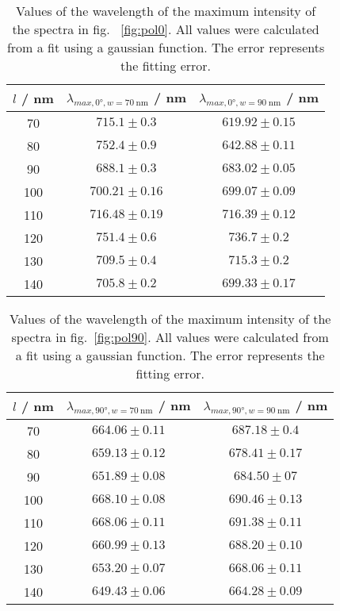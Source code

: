 \begin{table}
    \centering
    \begin{tabular}{c|cc}
        \toprule
        $l$ / \si{\nano\meter} &   $\lambda_{max,\ang{0},w=\SI{70}{\nano\meter}}$ / \si{\nano\meter}& $\lambda_{max,\ang{0},w=\SI{90}{\nano\meter}}$ / \si{\nano\meter}\\
        \midrule
        70 &  $715.1 \pm 0.3$&  $619.92\pm 0.15$\\
        80 &  $752.4 \pm 0.9$&  $642.88\pm 0.11$\\
        90  &  $688.1\pm 0.3$&  $683.02\pm 0.05$\\
        100 &  $700.21\pm 0.16$&  $699.07\pm 0.09$\\
        110 &  $716.48\pm 0.19$&  $716.39\pm 0.12$\\
        120 &  $751.4\pm 0.6$&  $736.7\pm 0.2$\\
        130 &  $709.5\pm 0.4$&  $715.3\pm 0.2$\\
        140 &  $705.8\pm 0.2$&  $699.33\pm 0.17$\\
        \bottomrule
    \end{tabular}
    \caption{Values of the wavelength of the maximum intensity of the spectra in fig.~ \ref{fig:pol0}. All values were calculated from a fit using a gaussian function. The error represents the fitting error.}
    \label{tab:lamMax0}
\end{table}

\begin{table}
    \centering
    \begin{tabular}{c|cc}
        \toprule
        $l$ / \si{\nano\meter} & $\lambda_{max,\ang{90},w=\SI{70}{\nano\meter}}$ / \si{\nano\meter}& $\lambda_{max,\ang{90},w=\SI{90}{\nano\meter}}$ / \si{\nano\meter}\\
        \midrule
        70  &  $664.06\pm 0.11$&  $687.18\pm 0.4$\\
        80  &  $659.13\pm 0.12$&  $678.41\pm 0.17$\\
        90  &  $651.89\pm 0.08$&  $684.50\pm 07$\\
        100 &  $668.10\pm 0.08$&  $690.46\pm 0.13$\\
        110 &  $668.06\pm 0.11$&  $691.38\pm 0.11$\\
        120 &  $660.99\pm 0.13$&  $688.20\pm 0.10$\\
        130 &  $653.20\pm 0.07$&   $668.06\pm 0.11$\\
        140 &  $649.43\pm 0.06$&  $664.28\pm 0.09$\\
        \bottomrule
    \end{tabular}
    \caption{Values of the wavelength of the maximum intensity of the spectra in fig.~\ref{fig:pol90}. All values were calculated from a fit using a gaussian function. The error represents the fitting error.}
    \label{tab:lamMax90}
\end{table}


